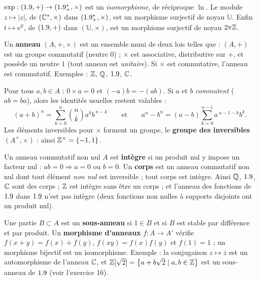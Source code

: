 \begin{exemple}
$\exp:(1.9,+)\to(1.9_{+}^{*},\times)$ est un \emph{isomorphisme}, de
réciproque $\ln$. Le module $z\mapsto|z|$, de $(\mathbb{C}^{*},\times)$ dans
$(1.9_{+}^{*},\times)$, est un morphisme surjectif de noyau $\mathbb{U}$.
Enfin $t\mapsto\mathrm{e}^{\mathrm{i}t}$, de $(1.9,+)$ dans
$(\mathbb{U},\times)$, est un morphisme surjectif de noyau $2\pi\mathbb{Z}$.
\end{exemple}


\begin{definition}[Anneau]
Un \textbf{anneau} $(A,+,\times)$ est un ensemble muni de deux lois telles
que : $(A,+)$ est un groupe commutatif (neutre $0$) ; $\times$ est
associative, distributive sur $+$, et possède un neutre $1$ (tout anneau
est \emph{unitaire}). Si $\times$ est commutative, l'anneau est commutatif.
Exemples : $\mathbb{Z}$, $\mathbb{Q}$, $1.9$, $\mathbb{C}$.
\end{definition}

\begin{propriete}
Pour tous $a,b\in A$ : $0\times a=0$ et $(-a)b=-(ab)$. Si $a$ et $b$
\emph{commutent} ($ab=ba$), alors les identités usuelles restent valables :
\[
  (a+b)^{n}=\sum_{k=0}^{n}\binom{n}{k}a^{k}b^{\,n-k}
  \qquad\text{et}\qquad
  a^{n}-b^{n}=(a-b)\sum_{k=0}^{n-1}a^{\,n-1-k}b^{k}.
\]
Les éléments inversibles pour $\times$ forment un groupe, le \textbf{groupe
des inversibles} $(A^{\times},\times)$ : ainsi $\mathbb{Z}^{\times}=\left\{-1,1\right\}$.
\end{propriete}

\begin{definition}
Un anneau commutatif non nul $A$ est \textbf{intègre} si un produit nul y
impose un facteur nul : $ab=0\Rightarrow a=0$ ou $b=0$. Un \textbf{corps}
est un anneau commutatif non nul dont tout élément \emph{non nul} est
inversible ; tout corps est intègre. Ainsi $\mathbb{Q}$, $1.9$, $\mathbb{C}$ sont des
corps ; $\mathbb{Z}$ est intègre sans être un corps ; et l'anneau des fonctions de
$1.9$ dans $1.9$ n'est pas intègre (deux fonctions non nulles à supports
disjoints ont un produit nul).
\end{definition}

\begin{definition}
Une partie $B\subset A$ est un \textbf{sous-anneau} si $1\in B$ et si $B$
est stable par différence et par produit. Un \textbf{morphisme d'anneaux}
$f:A\to A'$ vérifie $f(x+y)=f(x)+f(y)$, $f(xy)=f(x)f(y)$ et $f(1)=1$ ;
un morphisme bijectif est un isomorphisme. Exemple : la conjugaison
$z\mapsto\overline{z}$ est un automorphisme de l'anneau $\mathbb{C}$, et
$\mathbb{Z}[\sqrt2]=\left\{a+b\sqrt2 \mid a,b\in\mathbb{Z}\right\}$ est un sous-anneau de $1.9$
(voir l'exercice 16).
\end{definition}

